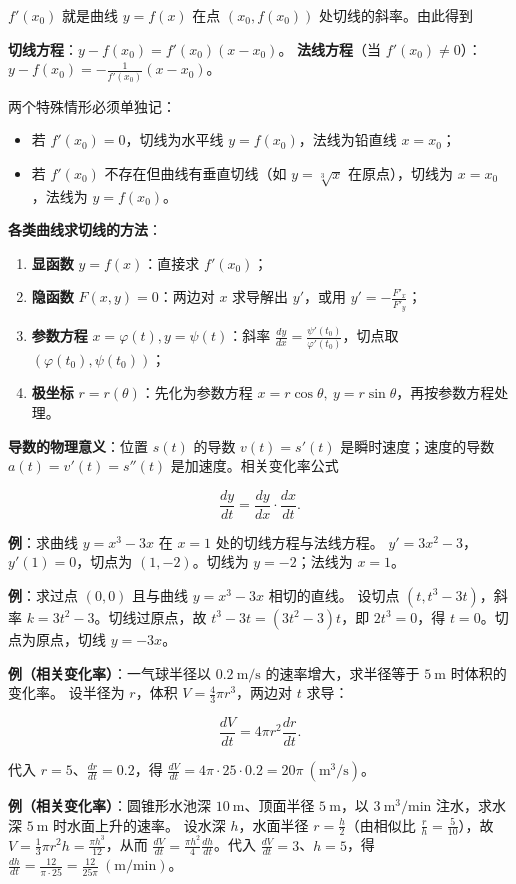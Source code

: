 \documentclass[11pt,openany,UTF8]{ctexbook}
\begin{document}
$f'(x_0)$ 就是曲线 $y=f(x)$ 在点 $(x_0,f(x_0))$ 处切线的斜率。由此得到

\textbf{切线方程}：$y-f(x_0)=f'(x_0)(x-x_0)$。 \textbf{法线方程}（当 $f'(x_0)\ne 0$）：$y-f(x_0)=-\frac{1}{f'(x_0)}(x-x_0)$。

两个特殊情形必须单独记：

\begin{itemize}
\item 若 $f'(x_0)=0$，切线为水平线 $y=f(x_0)$，法线为铅直线 $x=x_0$；
\item 若 $f'(x_0)$ 不存在但曲线有垂直切线（如 $y=\sqrt[3]{x}$ 在原点），切线为 $x=x_0$，法线为 $y=f(x_0)$。
\end{itemize}
\textbf{各类曲线求切线的方法}：

\begin{enumerate}
\item \textbf{显函数} $y=f(x)$：直接求 $f'(x_0)$；
\item \textbf{隐函数} $F(x,y)=0$：两边对 $x$ 求导解出 $y'$，或用 $y'=-\frac{F'_x}{F'_y}$；
\item \textbf{参数方程} $x=\varphi(t),y=\psi(t)$：斜率 $\frac{dy}{dx}=\frac{\psi'(t_0)}{\varphi'(t_0)}$，切点取 $(\varphi(t_0),\psi(t_0))$；
\item \textbf{极坐标} $r=r(\theta)$：先化为参数方程 $x=r\cos\theta,\ y=r\sin\theta$，再按参数方程处理。
\end{enumerate}
\textbf{导数的物理意义}：位置 $s(t)$ 的导数 $v(t)=s'(t)$ 是瞬时速度；速度的导数 $a(t)=v'(t)=s''(t)$ 是加速度。相关变化率公式

\[\frac{dy}{dt}=\frac{dy}{dx}\cdot\frac{dx}{dt}.\]

\textbf{例}：求曲线 $y=x^3-3x$ 在 $x=1$ 处的切线方程与法线方程。 $y'=3x^2-3$，$y'(1)=0$，切点为 $(1,-2)$。切线为 $y=-2$；法线为 $x=1$。

\textbf{例}：求过点 $(0,0)$ 且与曲线 $y=x^3-3x$ 相切的直线。 设切点 $(t,t^3-3t)$，斜率 $k=3t^2-3$。切线过原点，故 $t^3-3t=(3t^2-3)t$，即 $2t^3=0$，得 $t=0$。切点为原点，切线 $y=-3x$。

\textbf{例（相关变化率）}：一气球半径以 $0.2\ \mathrm{m/s}$ 的速率增大，求半径等于 $5\ \mathrm{m}$ 时体积的变化率。 设半径为 $r$，体积 $V=\frac43\pi r^3$，两边对 $t$ 求导：

\[\frac{dV}{dt}=4\pi r^2\frac{dr}{dt}.\]

代入 $r=5$、$\frac{dr}{dt}=0.2$，得 $\frac{dV}{dt}=4\pi\cdot 25\cdot 0.2=20\pi\ (\mathrm{m^3/s})$。

\textbf{例（相关变化率）}：圆锥形水池深 $10\ \mathrm{m}$、顶面半径 $5\ \mathrm{m}$，以 $3\ \mathrm{m^3/min}$ 注水，求水深 $5\ \mathrm{m}$ 时水面上升的速率。 设水深 $h$，水面半径 $r=\frac{h}{2}$（由相似比 $\frac{r}{h}=\frac{5}{10}$），故 $V=\frac13\pi r^2h=\frac{\pi h^3}{12}$，从而 $\frac{dV}{dt}=\frac{\pi h^2}{4}\frac{dh}{dt}$。代入 $\frac{dV}{dt}=3$、$h=5$，得 $\frac{dh}{dt}=\frac{12}{\pi\cdot 25}=\frac{12}{25\pi}\ (\mathrm{m/min})$。
\end{document}
